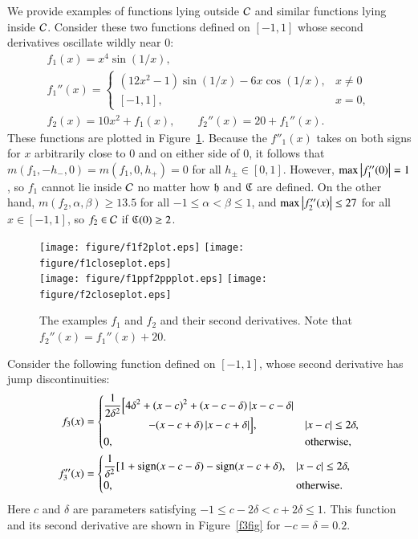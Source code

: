 \documentclass[review]{elsarticle}
\theoremstyle{definition}
\begin{document}
We provide examples of functions lying outside $\mathcal{C}$
and similar functions lying inside $\mathcal{C}$. Consider these two functions defined
on $[-1,1]$ whose second derivatives oscillate wildly near $0$:
\begin{gather*}
f_1(x) = x^4 \sin(1/x), \\
 f_1''(x) = \begin{cases} (12x^2 - 1) \sin(1/x) -6 x \cos(1/x), & x \ne 0 \\
 [-1,1], & x = 0, \end{cases} \\
f_2(x) = 10  x^2 + f_1(x), \qquad f_2''(x) = 20+ f_1''(x).
\end{gather*}
These functions are plotted in Figure~\ref{f1f2fig}. Because the $f''_1(x)$
takes on both signs for $x$ arbitrarily close to $0$ and on either side of $0$,
it follows that  $m(f_1,-h_-,0) = m(f_1,0,h_+) = 0$ for all $h_\pm \in [0,1]$.
However, $\max\left \lvert f''_1(0) \right \rvert = 1$, so $f_1$ cannot lie inside
$\mathcal{C}$ no matter how $\mathfrak{h}$ and $\mathfrak{C}$ are defined. On the other hand,
$m(f_2,\alpha, \beta) \ge 13.5$ for all $-1 \le \alpha < \beta \le 1$, and
$\max \left \lvert f''_2(x) \right \rvert \le 27$ for all $x \in [-1,1]$, so $f_2 \in
\mathcal{C}$ if $\mathfrak{C}(0) \ge 2$.

\begin{figure}[t]
\centering
\texttt{[image: figure/f1f2plot.eps]} \quad
\texttt{[image: figure/f1closeplot.eps]} \\
\texttt{[image: figure/f1ppf2ppplot.eps]} \quad
\texttt{[image: figure/f2closeplot.eps]}
\caption{The examples $f_1$ and $f_2$ and their second derivatives. Note that
$f_2''(x) = f_1''(x) + 20$. \label{f1f2fig}}
\end{figure}

Consider the following function defined on $[-1,1]$, whose second derivative has jump discontinuities:
\begin{align} \label{f3def}
f_3(x) & = \begin{cases} \displaystyle
   \frac{1}{2\delta^2} \Bigl [4 \delta^2 + (x-c)^2 + (x-c-\delta)\left \lvert x-c-\delta \right \rvert
\\ \qquad \qquad
    - (x-c+\delta)\left \lvert x-c+\delta \right \rvert \Bigr ], & \left \lvert x-c \right \rvert \le 2\delta,
\\ 0, & \text{otherwise},
\end{cases} \\
\nonumber
f''_3(x) & =
\begin{cases} \displaystyle
    \frac{1}{\delta^2} [1 + \operatorname{sign}(x-c-\delta) - \operatorname{sign}(x-c+\delta), & \left \lvert x-c \right \rvert \le 2\delta,
\\ 0, & \text{otherwise}.
\end{cases}
\end{align}
Here $c$ and $\delta$ are parameters satisfying $-1 \le c-2 \delta < c+ 2\delta \le 1$. This function and its second derivative
are shown in Figure~\ref{f3fig} for $-c=\delta = 0.2$.
\end{document}
